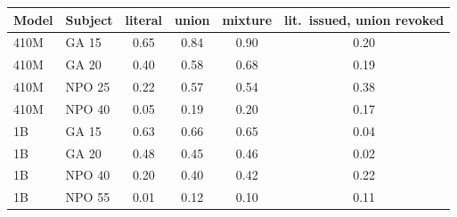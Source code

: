 \begin{tabular}{llcccc}
\toprule
Model & Subject & literal & union & mixture & lit.\ issued, union revoked \\
\midrule
410M & GA 15 & 0.65 & 0.84 & 0.90 & 0.20 \\
410M & GA 20 & 0.40 & 0.58 & 0.68 & 0.19 \\
410M & NPO 25 & 0.22 & 0.57 & 0.54 & 0.38 \\
410M & NPO 40 & 0.05 & 0.19 & 0.20 & 0.17 \\
1B & GA 15 & 0.63 & 0.66 & 0.65 & 0.04 \\
1B & GA 20 & 0.48 & 0.45 & 0.46 & 0.02 \\
1B & NPO 40 & 0.20 & 0.40 & 0.42 & 0.22 \\
1B & NPO 55 & 0.01 & 0.12 & 0.10 & 0.11 \\
\bottomrule
\end{tabular}
